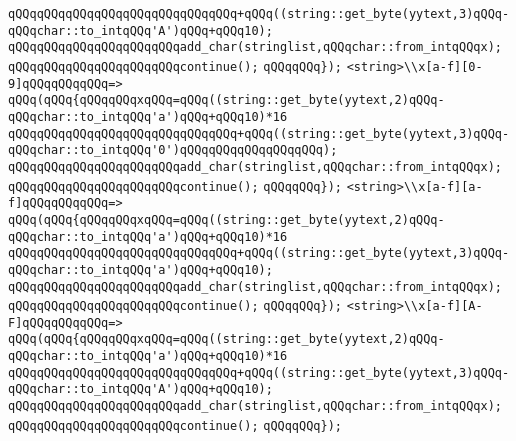 \verb|qQQqqQQqqQQqqQQqqQQqqQQqqQQqqQQq+qQQq((string::get_byte(yytext,3)qQQq-qQQqchar::to_intqQQq'A')qQQq+qQQq10);|\newline
\verb|qQQqqQQqqQQqqQQqqQQqqQQqadd_char(stringlist,qQQqchar::from_intqQQqx);|\newline
\verb|qQQqqQQqqQQqqQQqqQQqqQQqcontinue();|\newline
\verb|qQQqqQQq});|\newline
\verb|<string>\\x[a-f][0-9]qQQqqQQqqQQq=>|\newline
\verb|qQQq(qQQq{qQQqqQQqxqQQq=qQQq((string::get_byte(yytext,2)qQQq-qQQqchar::to_intqQQq'a')qQQq+qQQq10)*16|\newline
\verb|qQQqqQQqqQQqqQQqqQQqqQQqqQQqqQQq+qQQq((string::get_byte(yytext,3)qQQq-qQQqchar::to_intqQQq'0')qQQqqQQqqQQqqQQqqQQq);|\newline
\verb|qQQqqQQqqQQqqQQqqQQqqQQqadd_char(stringlist,qQQqchar::from_intqQQqx);|\newline
\verb|qQQqqQQqqQQqqQQqqQQqqQQqcontinue();|\newline
\verb|qQQqqQQq});|\newline
\verb|<string>\\x[a-f][a-f]qQQqqQQqqQQq=>|\newline
\verb|qQQq(qQQq{qQQqqQQqxqQQq=qQQq((string::get_byte(yytext,2)qQQq-qQQqchar::to_intqQQq'a')qQQq+qQQq10)*16|\newline
\verb|qQQqqQQqqQQqqQQqqQQqqQQqqQQqqQQq+qQQq((string::get_byte(yytext,3)qQQq-qQQqchar::to_intqQQq'a')qQQq+qQQq10);|\newline
\verb|qQQqqQQqqQQqqQQqqQQqqQQqadd_char(stringlist,qQQqchar::from_intqQQqx);|\newline
\verb|qQQqqQQqqQQqqQQqqQQqqQQqcontinue();|\newline
\verb|qQQqqQQq});|\newline
\verb|<string>\\x[a-f][A-F]qQQqqQQqqQQq=>|\newline
\verb|qQQq(qQQq{qQQqqQQqxqQQq=qQQq((string::get_byte(yytext,2)qQQq-qQQqchar::to_intqQQq'a')qQQq+qQQq10)*16|\newline
\verb|qQQqqQQqqQQqqQQqqQQqqQQqqQQqqQQq+qQQq((string::get_byte(yytext,3)qQQq-qQQqchar::to_intqQQq'A')qQQq+qQQq10);|\newline
\verb|qQQqqQQqqQQqqQQqqQQqqQQqadd_char(stringlist,qQQqchar::from_intqQQqx);|\newline
\verb|qQQqqQQqqQQqqQQqqQQqqQQqcontinue();|\newline
\verb|qQQqqQQq});|\newline
